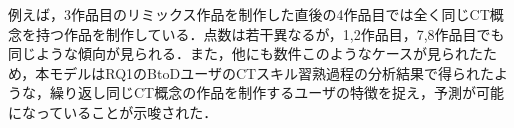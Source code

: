 \documentclass[submit]{ipsj}
\newcommand{\todo}[1]{\colorbox{yellow}{{\bf TODO}:}{\color{red} {\textbf{[#1]}}}}
\begin{document}






例えば，3作品目のリミックス作品を制作した直後の4作品目では全く同じCT概念を持つ作品を制作している．点数は若干異なるが，1,2作品目，7,8作品目でも同じような傾向が見られる．また，他にも数件このようなケースが見られたため，本モデルはRQ1のBtoDユーザのCTスキル習熟過程の分析結果で得られたような，繰り返し同じCT概念の作品を制作するユーザの特徴を捉え，予測が可能になっていることが示唆された．

\end{document}
